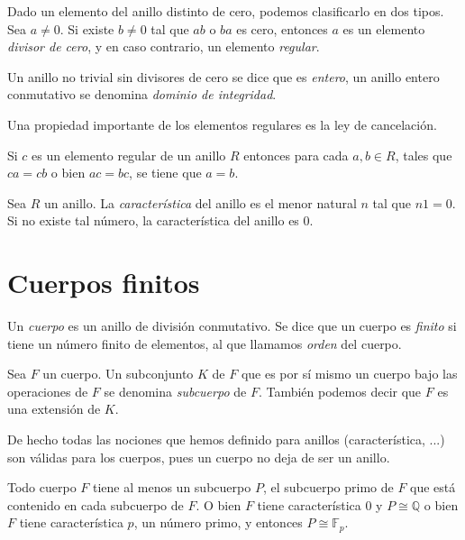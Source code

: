 
Dado un elemento del anillo distinto de cero, podemos clasificarlo en dos tipos. 
Sea \(a \neq 0\). 
Si existe \(b \neq 0\) tal que \(ab\) o \(ba\) es cero, entonces \(a\) es un elemento \textit{divisor de cero}, y en caso contrario, un elemento \textit{regular}.

Un anillo no trivial sin divisores de cero se dice que es \textit{entero}, un anillo entero conmutativo se denomina \textit{dominio de integridad}.

Una propiedad importante de los elementos regulares es la ley de cancelación.
\begin{proposition}
  Si \(c\) es un elemento regular de un anillo \(R\) entonces para cada \(a, b \in R\), tales que \(ca = cb\) o bien \(ac = bc\), se tiene que \(a = b\).
\end{proposition}

\begin{definition}
  Sea \(R\) un anillo. La \textit{característica} del anillo es el menor natural \(n\) tal que \(n1 = 0\).
  Si no existe tal número, la característica del anillo es \(0\).  
\end{definition}

\section{Cuerpos finitos}

\begin{definition}
  Un \textit{cuerpo} es un anillo de división conmutativo.
  Se dice que un cuerpo es \textit{finito} si tiene un número finito de elementos, al que llamamos \textit{orden} del cuerpo.
\end{definition}


Sea \(F\) un cuerpo. Un subconjunto \(K\) de \(F\) que es por sí mismo un cuerpo bajo las operaciones de \(F\) se denomina \textit{subcuerpo} de \(F\).
También podemos decir que \(F\) es una extensión de \(K\).

De hecho todas las nociones que hemos definido para anillos (característica, ...) son válidas para los cuerpos, pues un cuerpo no deja de ser un anillo.

\begin{theorem}
  \label{th:cuerpo-subcuerpo-primo-caracteristica}
  Todo cuerpo \(F\) tiene al menos un subcuerpo \(P\), el subcuerpo primo de \(F\) que está contenido en cada subcuerpo de \(F\).
  O bien \(F\) tiene característica 0 y \(P \cong \mathbb Q\) o bien \(F\) tiene característica \(p\), un número primo, y entonces \(P \cong \mathbb F_p\).
\end{theorem}



